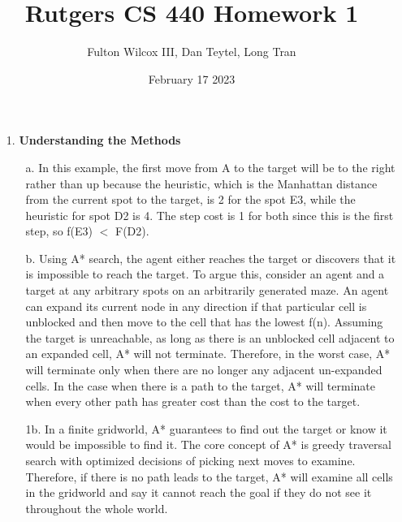\documentclass{article}
\title{Rutgers CS 440 Homework 1}
\author{Fulton Wilcox III, Dan Teytel, Long Tran}
\date{February 17 2023}
\begin{document}
\maketitle

    \begin{enumerate}
        \item[1.] \textbf{Understanding the Methods}
        \begin{enumerate}

            \begin{figure}[h!]
		\end{figure}
            
            \item[a.] In this example, the first move from A to the target will be to the right rather than up because the heuristic, which is the Manhattan distance from the current spot to the target, is 2 for the spot E3, while the heuristic for spot D2 is 4.  The step cost is 1 for both since this is the first step, so f(E3) $<$ F(D2).

            \item[b.] Using A* search, the agent either reaches the target or discovers that it is impossible to reach the target.
            To argue this, consider an agent and a target at any arbitrary spots on an arbitrarily generated maze.  An agent can expand its current node in any direction if that particular cell is unblocked and then move to the cell that has the lowest f(n).  Assuming the target is unreachable, as long as there is an unblocked cell adjacent to an expanded cell, A* will not terminate.  Therefore, in the worst case, A* will terminate only when there are no longer any adjacent un-expanded cells.  In the case when there is a path to the target, A* will terminate when every other path has greater cost than the cost to the target.

            \item[1b.] In a finite gridworld, A* guarantees to find out the target or know it would be impossible to find it. The core concept of A* is greedy traversal search with optimized decisions of picking next moves to examine. Therefore, if there is no path leads to the target, A* will examine all cells in the gridworld and say it cannot reach the goal if they do not see it throughout the whole world.


\end{enumerate}
\end{enumerate}
\end{document}
